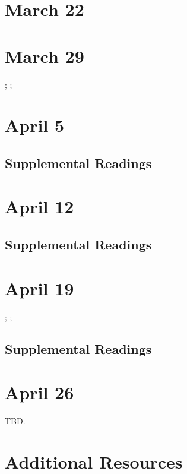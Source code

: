 \documentclass[11pt]{article}
\begin{document}
\section{March 22}

\cite{Pascoe:2011cj}

\section{March 29}

\cite{Cohn:1993wq}; \cite{Nafus:2012gg}; \cite{Reagle:2012vr}


\section{April 5 }

\cite{Cassell:2000vw}

\subsection{Supplemental Readings}
\cite{Burrill2008}

\section{April 12}

\cite{Kafai:2008wl}

\subsection{Supplemental Readings}
\cite{Shaw:2015dr}


\section{April 19}

\cite{Gaboury:2015uv}; \cite{Nooney:2013vu}; \cite{Wu:2007gs}

\subsection{Supplemental Readings}
\cite{Ruberg:2017ww}

\section{April 26}

TBD.

\newpage
\section{Additional Resources}
\nocite{*} 
\printbibliography
\end{document}
